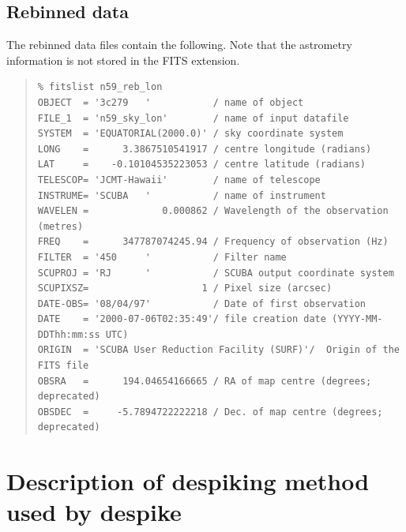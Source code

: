 \documentclass[twoside,11pt]{article}
\newcommand{\task}[1]{{\sf #1}}
\newenvironment{myquote}{\begin{quote}\begin{small}}{\end{small}\end{quote}}
\newcommand{\xlabel}[1]{}
\renewcommand{\_}{\texttt{\symbol{95}}}
\begin{document}
\subsection{Rebinned data}

The rebinned data files contain the following. Note that the astrometry
information is not stored in the FITS extension.

\begin{myquote}
\begin{verbatim}
% fitslist n59_reb_lon
OBJECT  = '3c279   '           / name of object
FILE_1  = 'n59_sky_lon'        / name of input datafile
SYSTEM  = 'EQUATORIAL(2000.0)' / sky coordinate system
LONG    =      3.3867510541917 / centre longitude (radians)
LAT     =    -0.10104535223053 / centre latitude (radians)
TELESCOP= 'JCMT-Hawaii'        / name of telescope
INSTRUME= 'SCUBA   '           / name of instrument
WAVELEN =             0.000862 / Wavelength of the observation (metres)
FREQ    =      347787074245.94 / Frequency of observation (Hz)
FILTER  = '450     '           / Filter name
SCUPROJ = 'RJ      '           / SCUBA output coordinate system
SCUPIXSZ=                    1 / Pixel size (arcsec)
DATE-OBS= '08/04/97'           / Date of first observation
DATE    = '2000-07-06T02:35:49'/ file creation date (YYYY-MM-DDThh:mm:ss UTC)
ORIGIN  = 'SCUBA User Reduction Facility (SURF)'/  Origin of the FITS file
OBSRA   =      194.04654166665 / RA of map centre (degrees; deprecated)
OBSDEC  =     -5.7894722222218 / Dec. of map centre (degrees; deprecated)
\end{verbatim}
\end{myquote}


\section{\xlabel{despiking_eg}Description of despiking method used by \task{despike}\label{despiking_eg}}
\end{document}
